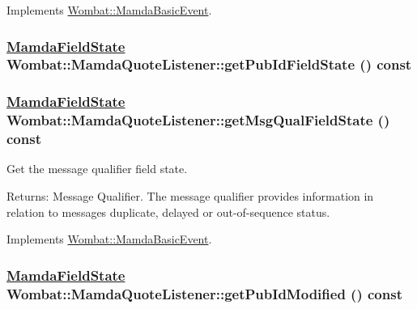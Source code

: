 Implements \hyperlink{classWombat_1_1MamdaBasicEvent_418ecb29b412cd42581b54c87b5360fd}{Wombat::Mamda\-Basic\-Event}.\hypertarget{classWombat_1_1MamdaQuoteListener_5c9caa111b19d3141eb64767b3e82ba1}{
\subsubsection[getPubIdFieldState]{\setlength{\rightskip}{0pt plus 5cm}\hyperlink{namespaceWombat_93aac974f2ab713554fd12a1fa3b7d2a}{Mamda\-Field\-State} Wombat::Mamda\-Quote\-Listener::get\-Pub\-Id\-Field\-State () const}}
\label{classWombat_1_1MamdaQuoteListener_5c9caa111b19d3141eb64767b3e82ba1}


\hypertarget{classWombat_1_1MamdaQuoteListener_84d03b5c192d75a4f5d6806028203c2e}{
\subsubsection[getMsgQualFieldState]{\setlength{\rightskip}{0pt plus 5cm}\hyperlink{namespaceWombat_93aac974f2ab713554fd12a1fa3b7d2a}{Mamda\-Field\-State} Wombat::Mamda\-Quote\-Listener::get\-Msg\-Qual\-Field\-State () const}}
\label{classWombat_1_1MamdaQuoteListener_84d03b5c192d75a4f5d6806028203c2e}


Get the message qualifier field state. 

\begin{Desc}
\item[Returns:]Message Qualifier. The message qualifier provides information in relation to messages duplicate, delayed or out-of-sequence status. \end{Desc}


Implements \hyperlink{classWombat_1_1MamdaBasicEvent_3454d51e1131d9949691ee4b4153cd97}{Wombat::Mamda\-Basic\-Event}.\hypertarget{classWombat_1_1MamdaQuoteListener_98ff1dc2bd71e67918d73b21f76046bb}{
\subsubsection[getPubIdModified]{\setlength{\rightskip}{0pt plus 5cm}\hyperlink{namespaceWombat_93aac974f2ab713554fd12a1fa3b7d2a}{Mamda\-Field\-State} Wombat::Mamda\-Quote\-Listener::get\-Pub\-Id\-Modified () const}}
\label{classWombat_1_1MamdaQuoteListener_98ff1dc2bd71e67918d73b21f76046bb}


